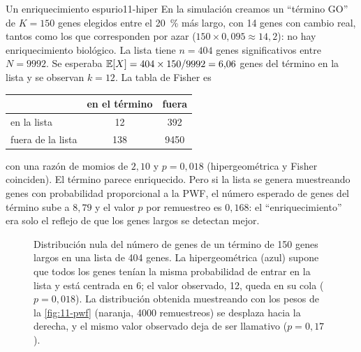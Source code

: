 \begin{ejemplo}{Un enriquecimiento espurio}{11-hiper}
En la simulación creamos un ``término GO'' de $K=150$ genes elegidos entre el \SI{20}{\percent} más largo, con 14 genes con cambio real, tantos como los que corresponden por azar ($150\times0{,}095\approx14{,}2$): no hay enriquecimiento biológico. La lista tiene $n=404$ genes significativos entre $N=\num{9992}$. Se esperaba $\mathbb{E}[X]=404\times150/\num{9992}=6{,}06$ genes del término en la lista y se observan $k=12$. La tabla de Fisher es
\begin{center}\small
\begin{tabular}{@{}lcc@{}}
\toprule
 & en el término & fuera\\
\midrule
en la lista & 12 & 392\\
fuera de la lista & 138 & \num{9450}\\
\bottomrule
\end{tabular}
\end{center}
con una razón de momios de $2{,}10$ y $p=0{,}018$ (hipergeométrica y Fisher coinciden). El término parece enriquecido. Pero si la lista se genera muestreando genes con probabilidad proporcional a la PWF, el número esperado de genes del término sube a $8{,}79$ y el valor $p$ por remuestreo es $0{,}168$: el ``enriquecimiento'' era solo el reflejo de que los genes largos se detectan mejor.
\end{ejemplo}

\begin{figure}[!htb]
\centering

\caption[Distribuciones nulas de la sobrerrepresentación]{Distribución nula del número de genes de un término de 150 genes largos en una lista de 404 genes. La hipergeométrica (azul) supone que todos los genes tenían la misma probabilidad de entrar en la lista y está centrada en 6; el valor observado, 12, queda en su cola ($p=0{,}018$). La distribución obtenida muestreando con los pesos de la \cref{fig:11-pwf} (naranja, \num{4000} remuestreos) se desplaza hacia la derecha, y el mismo valor observado deja de ser llamativo ($p=0{,}17$).}
\label{fig:11-hiper}
\end{figure}

